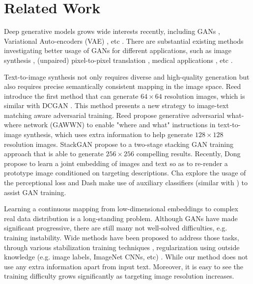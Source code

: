 \documentclass[10pt,twocolumn,letterpaper]{article}
\begin{document}
\section{Related Work}
Deep generative models grows wide interests recently, including GANs \cite{goodfellow2014generative}, Variational Auto-encoders (VAE) \cite{kingma2013auto}, etc \cite{oord2016pixel}. 
There are substantial existing methods investigating better usage of GANs for different applications, such as image synthesis \cite{radford2015unsupervised, shrivastava2016learning}, (unpaired) pixel-to-pixel translation \cite{isola2016image,zhu2017unpaired},  medical applications \cite{costa2017towards}, etc \cite{ledig2016photo,huang2016stacked}.

Text-to-image synthesis not only requires diverse and high-quality generation but also requires precise semantically consistent mapping in the image space.  Reed \etal \cite{reed2016generative} introduce the first method that can generate $64{\times}64$ resolution images, which is similar with DCGAN \cite{radford2015unsupervised}. This method presents a new strategy to image-text matching aware adversarial training. Reed \etal \cite{reed2016learning} propose generative
adversarial what-where network (GAWWN) to enable "where and what" instructions in text-to-image synthesis, which uses extra information to help generate $128{\times}128$ resolution images. StackGAN \etal \cite{han2017stackgan} propose to a two-stage stacking GAN training approach that is able to generate $256{\times}256$ compelling results. Recently, Dong \etal \cite{dong2017semantic} propose to learn a joint embedding of images and text so as to re-render a prototype image conditioned on targeting descriptions. Cha \etal \cite{char2017perceptual} explore the usage of the perceptional loss \cite{johnson2016perceptual} and Dash \etal \cite{dash2017tac} make use of auxiliary classifiers (similar with \cite{odena2016conditional}) to assist GAN training. 
	
Learning a continuous mapping from low-dimensional embeddings to complex real data distribution is a long-standing problem. Although GANs have made significant progressive, there are still many not well-solved difficulties, e.g. training instability. Wide methods have been proposed to address those tasks, through various stabilization training techniques \cite{salimans2016improved,arjovsky2017wasserstein,berthelot2017began,shrivastava2016learning,odena2016conditional}, regularization using outside knowledge (e.g. image labels, ImageNet CNNs, etc) \cite{dosovitskiy2016generating,ledig2016photo,dash2017tac,dash2017tac}. While our method does not use any extra information apart from input text. Moreover, it is easy to see the training difficulty grows significantly as targeting image resolution increases.
\end{document}

